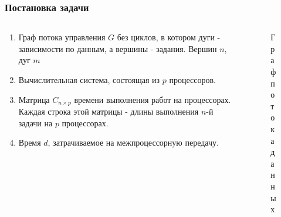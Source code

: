 \begin{frame}
    \frametitle{Постановка задачи}
    \begin{columns}
        \begin{column}{0.60\textwidth}
            \begin{enumerate}
                \item Граф потока управления $G$ без циклов, в котором дуги - зависимости по данным, а вершины - задания. Вершин $n$, дуг $m$
                \item Вычислительная система, состоящая из $p$ процессоров.
                \item Матрица $C_{n \times p}$ времени выполнения работ на процессорах. Каждая строка этой матрицы - длины выполнения $n$-й задачи на $p$ процессорах. 
                \item Время $d$, затрачиваемое на межпроцессорную передачу.
            \end{enumerate}
        \end{column}
        \begin{column}{0.40\textwidth}
            \begin{figure}
                \captionsetup{labelformat=empty}
                \caption{Граф потока данных}
            \end{figure}
        \end{column}
    \end{columns}
\end{frame}


